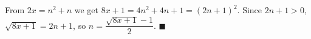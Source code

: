 From $2x=n^2+n$ we get $8x+1=4n^2+4n+1=(2n+1)^2$. Since $2n+1>0$, $\sqrt{8x+1}=2n+1$, so $n=\dfrac{\sqrt{8x+1}-1}{2}$. $\blacksquare$
